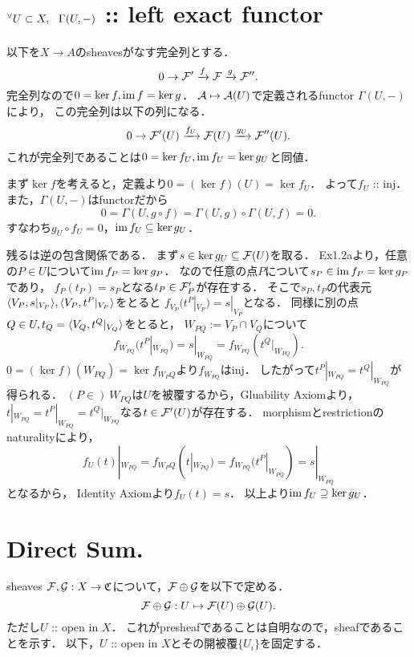 \documentclass[a4paper]{jsarticle}
\begin{document}
\section{${}^{\forall} U \subset X,~~ \Gamma(U,-)$ :: left exact functor} %
    以下を$X \to A$のsheavesがなす完全列とする．
    \[ 0 \to \mathcal{F}' \xrightarrow{f} \mathcal{F} \xrightarrow{g} \mathcal{F}''. \]
    完全列なので$0=\ker f, \operatorname{im} f=\ker g$．
    $\mathcal{A} \mapsto \mathcal{A}(U)$で定義されるfunctor $\Gamma(U,-)$により，
    この完全列は以下の列になる．
    \[ 0 \to \mathcal{F}'(U) \xrightarrow{f_U} \mathcal{F}(U) \xrightarrow{g_U} \mathcal{F}''(U). \]
    これが完全列であることは$0=\ker f_U, \operatorname{im} f_U=\ker g_U$と同値．

    まず$\ker f$を考えると，定義より$0=(\ker f)(U)=\ker f_U$．
    よって$f_U$ :: inj．
    また，$\Gamma(U,-)$はfunctorだから
    \[ 0=\Gamma(U,g \circ f)=\Gamma(U,g) \circ \Gamma(U,f)=0. \]
    すなわち$g_U \circ f_U=0$，$\operatorname{im} f_U \subseteq \ker g_U$．

    残るは逆の包含関係である．
    まず$s \in \ker g_U \subseteq \mathcal{F}(U)$を取る．
    Ex1.2aより，任意の$P \in U$について$\operatorname{im} f_P=\ker g_P$．
    なので任意の点$P$について$s_P \in \operatorname{im} f_P=\ker g_P$であり，
    $f_P(t_P)=s_P$となる$t_P \in \mathcal{F}'_P$が存在する．
    そこで$s_P,t_P$の代表元$\langle V_P,s|_{V_P} \rangle, \langle V_P,t^P|_{V_P} \rangle$をとると
    $f_{V_P}(t^P|_{V_P})=s|_{V_P}$となる．
    同様に別の点$Q \in U, t_Q=\langle V_Q,t^Q|_{V_Q} \rangle$をとると，
    $W_{PQ}:=V_P \cap V_Q$について
    \[ f_{W_{PQ}}(t^P|_{W_{PQ}})=s|_{W_{PQ}}=f_{W_{PQ}}(t^Q|_{W_{PQ}}). \]
    $0=(\ker f)(W_{PQ})=\ker f_{W_PQ}$より$f_{W_{PQ}}$はinj．
    したがって$t^P|_{W_{PQ}}=t^Q|_{W_{PQ}}$が得られる．
    $(P \in)~W_{PQ}$は$U$を被覆するから，Gluability Axiomより，
    $t|_{W_{PQ}}=t^P|_{W_{PQ}}=t^Q|_{W_{PQ}}$なる$t \in \mathcal{F}'(U)$が存在する．
    morphismとrestrictionのnaturalityにより，
    \[ f_{U}(t)|_{W_{PQ}}=f_{W_PQ}(t|_{W_{PQ}})=f_{W_{PQ}}(t^P|_{W_{PQ}})=s|_{W_{PQ}} \]となるから，
    Identity Axiomより$f_{U}(t)=s$．
    以上より$\operatorname{im} f_U \supseteq \ker g_U$．

\section{Direct Sum.} %
    sheaves $\mathcal{F},\mathcal{G}: X \to \mathfrak{C}$について，$\mathcal{F} \oplus \mathcal{G}$を以下で定める．
    \[ \mathcal{F} \oplus \mathcal{G}: U \mapsto \mathcal{F}(U) \oplus \mathcal{G}(U). \]
    ただし$U$ :: open in $X$．
    これがpresheafであることは自明なので，sheafであることを示す．
    以下，$U$ :: open in $X$とその開被覆$\{U_i\}$を固定する．
\end{document}
